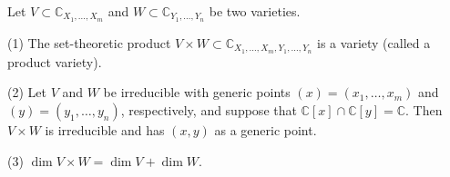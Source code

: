 Let $V \subset \mathbb{C}_{X_1, \ldots, X_m}$ and $W \subset \mathbb{C}_{Y_1, \ldots, Y_n}$ be two varieties.

(1) The set-theoretic product $V \times W \subset \mathbb{C}_{X_1, \ldots, X_m, Y_1, \ldots, Y_n}$ is a variety (called a product variety).

(2) Let $V$ and $W$ be irreducible with generic points $(x) = (x_1, \ldots, x_m)$ and $(y) = (y_1, \ldots, y_n)$, respectively, and suppose that $\mathbb{C}[x] \cap \mathbb{C}[y] = \mathbb{C}$. Then $V \times W$ is irreducible and has $(x, y)$ as a generic point.

(3) $\dim V \times W = \dim V + \dim W$.
